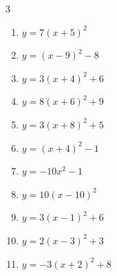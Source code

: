 \begin{multicols}{3}
\begin{enumerate}
        \phantom{$\displaystyle 頂点\left( -1 , 1 \right)$}

  \item $\displaystyle y=7\left( x+5\right)^{2}$

        \phantom{$\displaystyle 頂点\left( -5 , 0 \right)$}

  \item $\displaystyle y=\left( x-9\right)^{2}-8$

        \phantom{$\displaystyle 頂点\left( 9 , -8 \right)$}

  \item $\displaystyle y=3\left( x+4\right)^{2}+6$

        \phantom{$\displaystyle 頂点\left( -4 , 6 \right)$}

  \item $\displaystyle y=8\left( x+6\right)^{2}+9$

        \phantom{$\displaystyle 頂点\left( -6 , 9 \right)$}

  \item $\displaystyle y=3\left( x+8\right)^{2}+5$

        \phantom{$\displaystyle 頂点\left( -8 , 5 \right)$}

  \item $\displaystyle y=\left( x+4\right)^{2}-1$

        \phantom{$\displaystyle 頂点\left( -4 , -1 \right)$}

  \item $\displaystyle y=-10x^{2}-1$

        \phantom{$\displaystyle 頂点\left( 0 , -1 \right)$}

  \item $\displaystyle y=10\left( x-10\right)^{2}$

        \phantom{$\displaystyle 頂点\left( 10 , 0 \right)$}

  \item $\displaystyle y=3\left( x-1\right)^{2}+6$

        \phantom{$\displaystyle 頂点\left( 1 , 6 \right)$}

  \item $\displaystyle y=2\left( x-3\right)^{2}+3$

        \phantom{$\displaystyle 頂点\left( 3 , 3 \right)$}

  \item $\displaystyle y=-3\left( x+2\right)^{2}+8$

        \phantom{$\displaystyle 頂点\left( -2 , 8 \right)$}


\end{enumerate}
\end{multicols}
